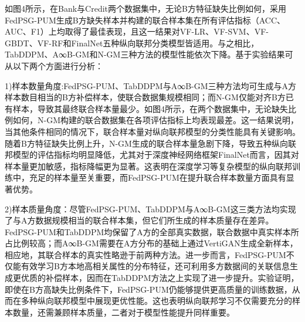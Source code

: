 如图4所示，在Bank与Credit两个数据集中，无论B方特征缺失比例如何，采用FedPSG-PUM生成B方缺失样本并构建的联合样本集在所有评估指标（ACC、AUC、F1）上均取得了最佳表现，且这一结果对VF-LR、VF-SVM、VF-GBDT、VF-RF和FinalNet五种纵向联邦分类模型皆适用。与之相比，TabDDPM、A∞B-GM和N-GM三种方法的模型性能依次下降。基于实验结果可从以下两个方面进行分析：  

1)样本数量角度:FedPSG-PUM、TabDDPM与A∞B-GM三种方法均可生成与A方样本数目相当的B方补偿样本，使联合数据集规模相同；而N-GM仅能对齐B方已有样本，导致其最终联合样本量最少。如图4所示，在两个数据集中，无论缺失比例如何，N-GM构建的联合数据集在各项评估指标上均表现最差。这一结果说明，当其他条件相同的情况下，联合样本量对纵向联邦模型的分类性能具有关键影响。随着B方特征缺失比例上升，N-GM生成的联合样本量急剧下降，导致五种纵向联邦模型的评估指标均明显降低，尤其对于深度神经网络框架FinalNet而言，因其对样本量更加敏感，指标降幅更为显著。这表明在深度学习等复杂模型的纵向联邦训练中，充足的样本量至关重要，而FedPSG-PUM在提升联合样本数量方面具有显著优势。

2)样本质量角度：尽管FedPSG-PUM、TabDDPM与A∞B-GM这三类方法均实现了与A方数据规模相当的联合样本集，但它们所生成的样本质量存在差异。FedPSG-PUM和TabDDPM均保留了A方的全部真实数据，联合数据中真实样本所占比例较高；而A∞B-GM需要在A方分布的基础上通过VertiGAN生成全新样本，相应地，其联合样本的真实性略逊于前两种方法。进一步而言，FedPSG-PUM不仅能有效学习B方本地高相关属性的分布特征，还可利用多方数据间的关联信息生成更优质的补偿样本，因而在TabDDPM方法之上实现了进一步提升。实验证明，即使在B方高缺失比例条件下，FedPSG-PUM仍能够提供更高质量的训练数据，从而在多种纵向联邦模型中展现更优性能。这也表明纵向联邦学习不仅需要充分的样本数量，还需兼顾样本质量，二者对于模型性能提升同样重要。